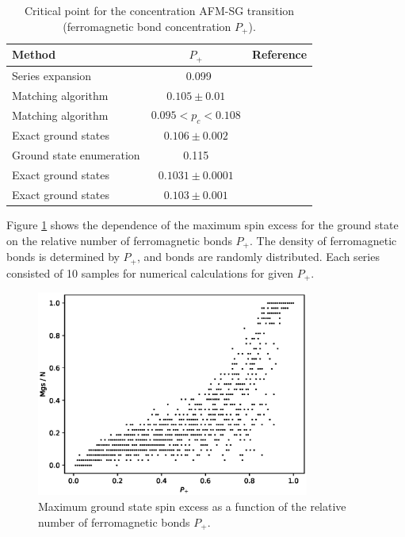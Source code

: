 \documentclass[preprint,12pt]{elsarticle}
\begin{document}
	\begin{table}[!h]
		\centering
		\begin{tabular}{|l|c|l|}
			\hline
			Method & \( P_{+} \) & Reference \\ \hline
			Series expansion & ~0.099 & \cite{PhysRevB.19.260} \\ \hline
			Matching algorithm & \( 0.105 \pm 0.01 \) & \cite{H_Freund_1989} \\ \hline
			Matching algorithm & \( 0.095 < p_c < 0.108 \) & \cite{BENDISCH1994139} \\ \hline
			Exact ground states & \( 0.106 \pm 0.002 \) & \cite{N.Kawashima_1997} \\ \hline
			Ground state enumeration & 0.115 & \cite{PhysRevE.58.1502} \\ \hline
			Exact ground states & \( 0.1031 \pm 0.0001 \) & \cite{WANG200331} \\ \hline
			Exact ground states & \( 0.103 \pm 0.001 \) & \cite{amoruso2004domain} \\ \hline
		\end{tabular}
		\caption{Critical point for the concentration AFM-SG transition (ferromagnetic bond concentration $ P_+ $).}
		\label{tab:lit_phase}
	\end{table}
	
	Figure \ref{fig:Mgs(P+)} shows the dependence of the maximum spin excess for the ground state on the relative number of ferromagnetic bonds $P_+$. The density of ferromagnetic bonds is determined by $P_+$, and bonds are randomly distributed. Each series consisted of 10 samples for numerical calculations for given $P_+$.
	
	\begin{figure}[H]
		\centering
		\includegraphics[width=0.8\textwidth]{images/Mgs(P+).eps}
		\caption{Maximum ground state spin excess as a function of the relative number of ferromagnetic bonds $P_+$.}
		\label{fig:Mgs(P+)}
	\end{figure}
	
\end{document}
